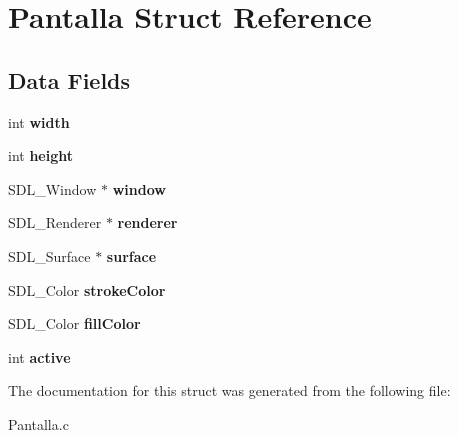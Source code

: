 \hypertarget{struct_pantalla}{}\section{Pantalla Struct Reference}
\label{struct_pantalla}
\subsection*{Data Fields}
\begin{DoxyCompactItemize}
\item 
\mbox{\label{struct_pantalla_a2474a5474cbff19523a51eb1de01cda4}} 
int {\bfseries width}
\item 
\mbox{\label{struct_pantalla_ad12fc34ce789bce6c8a05d8a17138534}} 
int {\bfseries height}
\item 
\mbox{\label{struct_pantalla_aaa8e409e04dcf575ef63fd5fb3db06f9}} 
S\+D\+L\+\_\+\+Window $\ast$ {\bfseries window}
\item 
\mbox{\label{struct_pantalla_a966da7a60c4ea3ba301e26ccc5efe452}} 
S\+D\+L\+\_\+\+Renderer $\ast$ {\bfseries renderer}
\item 
\mbox{\label{struct_pantalla_a2f5cac12e913bcfcff660305bf88dd3b}} 
S\+D\+L\+\_\+\+Surface $\ast$ {\bfseries surface}
\item 
\mbox{\label{struct_pantalla_a695e25e820714ff63dc741c0ecb10c81}} 
S\+D\+L\+\_\+\+Color {\bfseries stroke\+Color}
\item 
\mbox{\label{struct_pantalla_a53aea54ca42716a1ba6d2fa9cfb061ca}} 
S\+D\+L\+\_\+\+Color {\bfseries fill\+Color}
\item 
\mbox{\label{struct_pantalla_aa5805c5e936174e5092bf7a5b78e7e64}} 
int {\bfseries active}
\end{DoxyCompactItemize}


The documentation for this struct was generated from the following file\+:\begin{DoxyCompactItemize}
\item 
Pantalla.\+c\end{DoxyCompactItemize}
